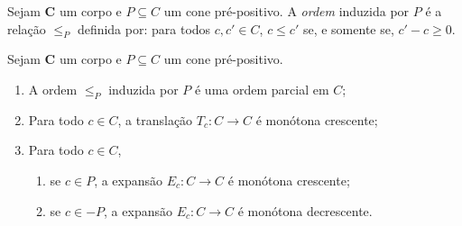 \begin{definition}
Sejam $\bm C$ um corpo e $P \subseteq C$ um cone pré-positivo.  A \emph{ordem} induzida por $P$ é a relação $\leq_P$ definida por: para todos $c,c' \in C$, $c \leq c'$ se, e somente se, $c' - c \geq 0$.
\end{definition}

\begin{proposition}
Sejam $\bm C$ um corpo e $P \subseteq C$ um cone pré-positivo.
	\begin{enumerate}
	\item A ordem $\leq_P$ induzida por $P$ é uma ordem parcial em $C$;

	\item Para todo $c \in C$, a translação $T_c\colon C \to C$ é monótona crescente;

	\item Para todo $c \in C$,
		\begin{enumerate}
		\item se $c \in P$, a expansão $E_c\colon C \to C$ é monótona crescente;

		\item se $c \in -P$, a expansão $E_c\colon C \to C$ é monótona decrescente.
		\end{enumerate}
	\end{enumerate}
\end{proposition}
